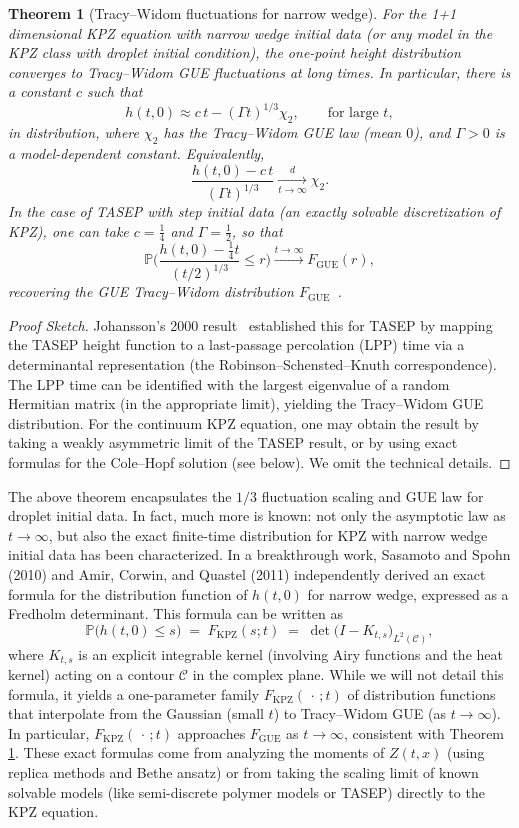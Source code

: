 \documentclass[letterpaper,11pt,oneside,reqno]{article}
\numberwithin{equation}{section}
\newtheorem{theorem}[proposition]{Theorem}
\theoremstyle{definition}
\begin{document}
\begin{theorem}[Tracy–Widom fluctuations for narrow wedge]\label{thm:nw-TW}
For the 1+1 dimensional KPZ equation with narrow wedge initial data (or any model in the KPZ class with droplet initial condition), the one-point height distribution converges to Tracy–Widom GUE fluctuations at long times. In particular, there is a constant $c$ such that
\[ h(t,0) \approx c\,t - (\Gamma t)^{1/3}\chi_2, \qquad \text{for large } t, \]
in distribution, where $\chi_2$ has the Tracy–Widom GUE law (mean $0$), and $\Gamma>0$ is a model-dependent constant. Equivalently,
\[ \frac{h(t,0) - c\,t}{(\Gamma t)^{1/3}} \xrightarrow[t\to\infty]{d} \chi_2.\]
In the case of TASEP with step initial data (an exactly solvable discretization of KPZ), one can take $c=\frac{1}{4}$ and $\Gamma=\frac{1}{2}$, so that
\[ \mathbb{P}\!\Big( \frac{h(t,0) - \frac{1}{4}t}{(t/2)^{1/3}} \le r \Big) \xrightarrow{t\to\infty} F_{\mathrm{GUE}}(r), \]
recovering the GUE Tracy–Widom distribution $F_{\mathrm{GUE}}$ \cite{johansson2000shape}.
\end{theorem}

\begin{proof}[Proof Sketch] Johansson’s 2000 result \cite{johansson2000shape} established this for TASEP by mapping the TASEP height function to a last-passage percolation (LPP) time via a determinantal representation (the Robinson–Schensted–Knuth correspondence). The LPP time can be identified with the largest eigenvalue of a random Hermitian matrix (in the appropriate limit), yielding the Tracy–Widom GUE distribution. For the continuum KPZ equation, one may obtain the result by taking a weakly asymmetric limit of the TASEP result, or by using exact formulas for the Cole–Hopf solution (see below). We omit the technical details.
\end{proof}

The above theorem encapsulates the $1/3$ fluctuation scaling and GUE law for droplet initial data. In fact, much more is known: not only the asymptotic law as $t\to\infty$, but also the exact finite-time distribution for KPZ with narrow wedge initial data has been characterized. In a breakthrough work, Sasamoto and Spohn (2010) and Amir, Corwin, and Quastel (2011) independently derived an exact formula for the distribution function of $h(t,0)$ for narrow wedge, expressed as a Fredholm determinant. This formula can be written as
\[ \mathbb{P}\!\big(h(t,0) \le s\big) \;=\; F_{\text{KPZ}}(s;t) \;=\; \det\!\big(I - K_{t,s}\big)_{L^2(\mathcal{C})}, \]
where $K_{t,s}$ is an explicit integrable kernel (involving Airy functions and the heat kernel) acting on a contour $\mathcal{C}$ in the complex plane. While we will not detail this formula, it yields a one-parameter family $F_{\text{KPZ}}(\,\cdot\,;t)$ of distribution functions that interpolate from the Gaussian (small $t$) to Tracy–Widom GUE (as $t\to\infty$). In particular, $F_{\text{KPZ}}(\,\cdot\,;t)$ approaches $F_{\mathrm{GUE}}$ as $t\to\infty$, consistent with Theorem \ref{thm:nw-TW}. These exact formulas come from analyzing the moments of $Z(t,x)$ (using replica methods and Bethe ansatz) or from taking the scaling limit of known solvable models (like semi-discrete polymer models or TASEP) directly to the KPZ equation.
\end{document}
